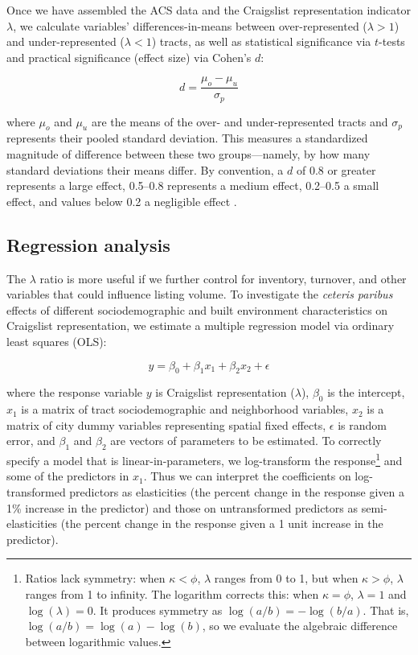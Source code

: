 \documentclass[11pt,letterpaper]{article}
\begin{document}
Once we have assembled the ACS data and the Craigslist representation indicator $\lambda$, we calculate variables' differences-in-means between over-represented ($\lambda>1$) and under-represented ($\lambda<1$) tracts, as well as statistical significance via $t$-tests and practical significance (effect size) via Cohen's $d$:

\begin{equation}
\label{eq:cohen_d}
d = \frac{\mu_o - \mu_u}{\sigma_p}
\end{equation}

where $\mu_o$ and $\mu_u$ are the means of the over- and under-represented tracts and $\sigma_p$ represents their pooled standard deviation. This measures a standardized magnitude of difference between these two groups---namely, by how many standard deviations their means differ. By convention, a $d$ of 0.8 or greater represents a large effect, 0.5--0.8 represents a medium effect, 0.2--0.5 a small effect, and values below 0.2 a negligible effect \citep{cohen_power_1992}.





\subsection{Regression analysis}

The $\lambda$ ratio is more useful if we further control for inventory, turnover, and other variables that could influence listing volume. To investigate the \textit{ceteris paribus} effects of different sociodemographic and built environment characteristics on Craigslist representation, we estimate a multiple regression model via ordinary least squares (OLS):

\begin{equation}
\label{eq:regression_formula}
y = \beta_0 + \beta_1 x_1 + \beta_2 x_2 + \epsilon
\end{equation}

where the response variable $y$ is Craigslist representation ($\lambda$), $\beta_0$ is the intercept, $x_1$ is a matrix of tract sociodemographic and neighborhood variables, $x_2$ is a matrix of city dummy variables representing spatial fixed effects, $\epsilon$ is random error, and $\beta_1$ and $\beta_2$ are vectors of parameters to be estimated. To correctly specify a model that is linear-in-parameters, we log-transform the response\footnote{Ratios lack symmetry: when $\kappa < \phi$, $\lambda$ ranges from 0 to 1, but when  $\kappa > \phi$, $\lambda$ ranges from 1 to infinity. The logarithm corrects this: when $\kappa = \phi$, $\lambda = 1$ and $\log(\lambda) = 0$. It produces symmetry as $\log(a/b) = -\log(b/a)$. That is, $\log(a/b) = \log(a)-\log(b)$, so we evaluate the algebraic difference between logarithmic values.} and some of the predictors in $x_1$. Thus we can interpret the coefficients on log-transformed predictors as elasticities (the percent change in the response given a 1\% increase in the predictor) and those on untransformed predictors as semi-elasticities (the percent change in the response given a 1 unit increase in the predictor).
\end{document}
